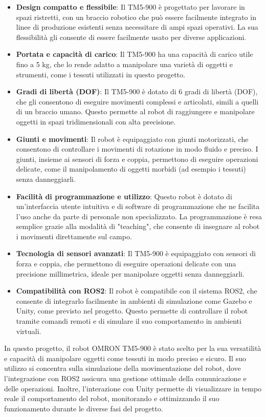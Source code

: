 \documentclass[11pt]{report}
\begin{document}
\begin{itemize}
    \item \textbf{Design compatto e flessibile}: Il TM5-900 è progettato per lavorare in spazi ristretti, con un braccio robotico che può essere facilmente integrato in linee di produzione esistenti senza necessitare di ampi spazi operativi. La sua flessibilità gli consente di essere facilmente usato per diverse applicazioni.
    \item \textbf{Portata e capacità di carico}: Il TM5-900 ha una capacità di carico utile fino a 5 kg, che lo rende adatto a manipolare una varietà di oggetti e strumenti, come i tessuti utilizzati in questo progetto.
    \item \textbf{Gradi di libertà (DOF)}: Il TM5-900 è dotato di 6 gradi di libertà (DOF), che gli consentono di eseguire movimenti complessi e articolati, simili a quelli di un braccio umano. Questo permette al robot di raggiungere e manipolare oggetti in spazi tridimensionali con alta precisione.
    \item \textbf{Giunti e movimenti}: Il robot è equipaggiato con giunti motorizzati, che consentono di controllare i movimenti di rotazione in modo fluido e preciso. I giunti, insieme ai sensori di forza e coppia, permettono di eseguire operazioni delicate, come il manipolamento di oggetti morbidi (ad esempio i tessuti) senza danneggiarli.
    \item \textbf{Facilità di programmazione e utilizzo}: Questo robot è dotato di un'interfaccia utente intuitiva e di software di programmazione che ne facilita l'uso anche da parte di personale non specializzato. La programmazione è resa semplice grazie alla modalità di "teaching", che consente di insegnare al robot i movimenti direttamente sul campo.
    \item \textbf{Tecnologia di sensori avanzati}: Il TM5-900 è equipaggiato con sensori di forza e coppia, che permettono di eseguire operazioni delicate con una precisione millimetrica, ideale per manipolare oggetti senza danneggiarli.
    \item \textbf{Compatibilità con ROS2}: Il robot è compatibile con il sistema ROS2, che consente di integrarlo facilmente in ambienti di simulazione come Gazebo e Unity, come previsto nel progetto. Questo permette di controllare il robot tramite comandi remoti e di simulare il suo comportamento in ambienti virtuali.
\end{itemize}

In questo progetto, il robot OMRON TM5-900 è stato scelto per la sua versatilità e capacità di manipolare oggetti come tessuti in modo preciso e sicuro. Il suo utilizzo si concentra sulla simulazione della movimentazione del robot, dove l'integrazione con ROS2 assicura una gestione ottimale della comunicazione e delle operazioni. Inoltre, l'interazione con Unity permette di visualizzare in tempo reale il comportamento del robot, monitorando e ottimizzando il suo funzionamento durante le diverse fasi del progetto.
\end{document}
